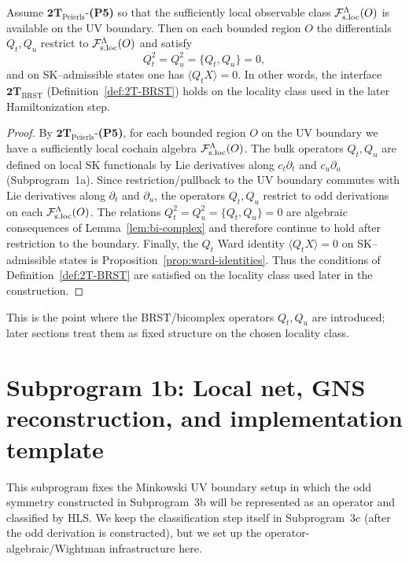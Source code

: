 \begin{theorem}
\label{thm:subprogram1a-BRST}
Assume $\mathbf{2T}_{\mathrm{Peierls}}$-\textbf{(P5)} so that the sufficiently
local observable class $\mathcal F_{\mathrm{s.loc}}^\Lambda(O)$ is available on the UV boundary.  Then on each
bounded region $O$ the differentials $Q_t,Q_u$ restrict to $\mathcal F_{\mathrm{s.loc}}^\Lambda(O)$ and satisfy
\[
Q_t^2=Q_u^2=\{Q_t,Q_u\}=0,
\]
and on SK--admissible states one has $\langle Q_t X\rangle=0$.  In other words,
the interface $\mathbf{2T}_{\mathrm{BRST}}$ (Definition~\ref{def:2T-BRST}) holds
on the locality class used in the later Hamiltonization step.
\end{theorem}

\begin{proof}
By $\mathbf{2T}_{\mathrm{Peierls}}$-\textbf{(P5)}, for each bounded region $O$
on the UV boundary we have a sufficiently local cochain algebra $\mathcal F_{\mathrm{s.loc}}^\Lambda(O)$.
The bulk operators $Q_t,Q_u$ are defined on local SK functionals by Lie
derivatives along $c_t\partial_t$ and $c_u\partial_u$ (Subprogram~1a).  Since
restriction/pullback to the UV boundary commutes with Lie derivatives along
$\partial_t$ and $\partial_u$, the operators $Q_t,Q_u$ restrict to odd
derivations on each $\mathcal F_{\mathrm{s.loc}}^\Lambda(O)$.
The relations $Q_t^2=Q_u^2=\{Q_t,Q_u\}=0$ are algebraic consequences of
Lemma~\ref{lem:bi-complex} and therefore continue to hold after restriction to
the boundary.
Finally, the $Q_t$ Ward identity $\langle Q_t X\rangle=0$ on SK--admissible
states is Proposition~\ref{prop:ward-identities}.
Thus the conditions of Definition~\ref{def:2T-BRST} are satisfied on the
locality class used later in the construction.
\end{proof}

\begin{remark}
This is the point where the BRST/bicomplex operators
\(Q_t,Q_u\) are introduced; later sections treat them as fixed structure on the
chosen locality class.
\end{remark}

\section{Subprogram 1b: Local net, GNS reconstruction, and implementation template}
\label{sec:subprogram1b}

This subprogram fixes the Minkowski UV boundary setup in which the odd symmetry
constructed in Subprogram~3b will be represented as an operator and classified by
HLS.  We keep the classification step itself in Subprogram~3c (after the odd
derivation is constructed), but we set up the operator-algebraic/Wightman
infrastructure here.

